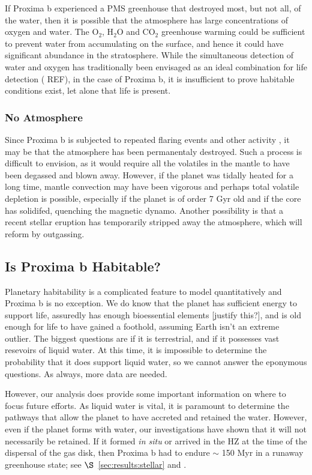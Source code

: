 \documentclass[preprint,12pt]{aastex}
\newcommand{\xxx}[1]{{\color{red} #1}} %
\begin{document}
If Proxima b experienced a PMS greenhouse that destroyed most, but not
all, of the water, then it is possible that the atmosphere has large
concentrations of oxygen and water. The O$_2$, H$_2$O and CO$_2$
greenhouse warming could be sufficient to prevent water from
accumulating on the surface, and hence it could have significant
abundance in the stratosphere. While the simultaneous detection of
water and oxygen has traditionally been envisaged as an ideal
combination for life detection (\xxx{REF}), in the case of Proxima b, it is
insufficient to prove habitable conditions exist, let alone that life
is present.

\subsubsection{No Atmosphere}
\label{sec:results:atmstates:noatmos}

Since Proxima b is subjected to repeated flaring events and other
activity \xxx{\citep{Walker81,Davenport16}}, it may be that the
atmosphere has been permanentaly destroyed. Such a process is
difficult to envision, as it would require all the volatiles in the
mantle to have been degassed and blown away. However, if the planet
was tidally heated for a long time, mantle convection may have been
vigorous and perhaps total volatile depletion is possible, especially
if the planet is of order 7 Gyr old and if the core has solidifed,
quenching the magnetic dynamo. Another possibility is that a recent
stellar eruption has temporarily stripped away the atmosphere, which
will reform by outgassing.

\subsection{Is Proxima b Habitable?}
\label{sec:results:habitable}

Planetary habitability is a complicated feature to model
quantitatively and Proxima b is no exception. We do know that the
planet has sufficient energy to support life, assuredly has enough
bioessential elements \xxx{[justify this?]}, and is old enough for life to have gained a
foothold, assuming Earth isn't an extreme outlier. The biggest
questions are if it is terrestrial, and if it possesses vast resevoirs
of liquid water. At this time, it is impossible to determine the
probability that it does support liquid water, so we cannot answer the
eponymous questions. As always, more data are needed.

However, our analysis does provide some important information on where
to focus future efforts. As liquid water is vital, it is paramount to
determine the pathways that allow the planet to have accreted and
retained the water. However, even if the planet forms with water, our
investigations have shown that it will not necessarily be retained. If
it formed {\it in situ} or arrived in the HZ at the time of the
dispersal of the gas disk, then Proxima b had to endure $\sim$ 150
Myr in a runaway greenhouse state; see $\S$~\ref{sec:results:stellar} and
\cite{LugerBarnes15}.
\end{document}
